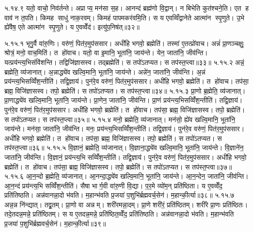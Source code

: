 ५.१४.९
यतो॒ वाचो॒ निव॑र्तन्ते। अप्राप्य॒ मन॑सा स॒ह। आनन्दं ब्रह्म॑णो वि॒द्वान्। न बिभेति कुत॑श्चने॒ति। एत ह वाव॑ न त॒पति। किमह साधु॑ नाक॒रवम्। किमहं पापमकर॑वमि॒ति। स य एवव्विँद्वानेते आत्मा॑न स्पृ॒णुते। उ॒भे ह्ये॑वैष॒ एते आत्मा॑न स्पृ॒णुते। य ए॒वव्वेँद॑। इत्यु॑प॒निष॑त्॥३२॥


\setcounter{anuvakam}{0}

५.१५.१
भृगु॒र्वै वा॑रु॒णिः। वरु॑णं॒ पित॑र॒मुप॑ससार। अधी॑हि भगवो॒ ब्रह्मेति॑। तस्मा॑ ए॒तत्प्रो॑वाच। अन्नं॑ प्रा॒णञ्चक्षुः॒ श्रोत्रं॒ मनो॒ वाच॒मिति॑। त हो॑वाच। यतो॒ वा इ॒मानि॒ भूता॑नि॒ जाय॑न्ते। येन॒ जाता॑नि॒ जीव॑न्ति। यत्प्रय॑न्त्य॒भिसंवि॑शन्ति। तद्विजि॑ज्ञासस्व। तद्ब्रह्मेति॑। स तपो॑ऽतप्यत। स तप॑स्त॒प्त्वा॥३३॥
५.१५.२
अन्नं॒ ब्रह्मेति॒ व्य॑जानात्। अ॒न्नाद्ध्ये॑व खल्वि॒मानि॒ भूता॑नि॒ जाय॑न्ते। अन्ने॑न॒ जाता॑नि॒ जीव॑न्ति। अ॒न्नं प्रय॑न्त्य॒भिसव्विँ॑श॒न्तीति॑। तद्वि॒ज्ञाय॑। पुन॑रे॒व वरु॑णं॒ पित॑र॒मुप॑ससार। अधी॑हि भगवो॒ ब्रह्मेति॑। त हो॑वाच। तप॑सा॒ ब्रह्म॒ विजि॑ज्ञासस्व। तपो॒ ब्रह्मेति॑। स तपो॑ऽतप्यत। स तप॑स्त॒प्त्वा॥३४॥
५.१५.३
प्रा॒णो ब्र॒ह्मेति॒ व्य॑जानात्। प्रा॒णाद्ध्ये॑व खल्वि॒मानि॒ भूता॑नि॒ जाय॑न्ते। प्रा॒णेन॒ जाता॑नि॒ जीव॑न्ति। प्रा॒णं प्रय॑न्त्य॒भिसव्विँ॑श॒न्तीति॑। तद्वि॒ज्ञाय॑। पुन॑रे॒व वरु॑णं॒ पित॑र॒मुप॑ससार। अधी॑हि भगवो॒ ब्रह्मेति॑। त हो॑वाच। तप॑सा॒ ब्रह्म॒ विजि॑ज्ञासस्व। तपो॒ ब्रह्मेति॑। स तपो॑ऽतप्यत। स तप॑स्त॒प्त्वा॥३५॥
५.१५.४
मनो॒ ब्रह्मेति॒ व्य॑जानात्। मन॑सो॒ ह्ये॑व खल्वि॒मानि॒ भूता॑नि॒ जाय॑न्ते। मन॑सा॒ जाता॑नि॒ जीव॑न्ति। मनः॒ प्रय॑न्त्य॒भिसव्विँ॑श॒न्तीति॑। तद्वि॒ज्ञाय॑। पुन॑रे॒व वरु॑णं॒ पित॑र॒मुप॑ससार। अधी॑हि भगवो॒ ब्रह्मेति॑। त हो॑वाच। तप॑सा॒ ब्रह्म॒ विजि॑ज्ञासस्व। तपो॒ ब्रह्मेति॑। स तपो॑ऽतप्यत। स तप॑स्त॒प्त्वा॥३६॥
५.१५.५
वि॒ज्ञानं॒ ब्रह्मेति॒ व्य॑जानात्। वि॒ज्ञाना॒द्ध्ये॑व खल्वि॒मानि॒ भूता॑नि॒ जाय॑न्ते। वि॒ज्ञाने॑न॒ जाता॑नि॒ जीव॑न्ति। वि॒ज्ञानं॒ प्रय॑न्त्य॒भि सव्विँ॑श॒न्तीति॑। तद्वि॒ज्ञाय॑। पुन॑रे॒व वरु॑णं॒ पित॑र॒मुप॑ससार। अधी॑हि भगवो॒ ब्रह्मेति॑। त हो॑वाच। तप॑सा॒ ब्रह्म॒ विजि॑ज्ञासस्व। तपो॒ ब्रह्मेति॑। स तपो॑ऽतप्यत। स तप॑स्त॒प्त्वा॥३७॥
५.१५.६
आ॒न॒न्दो ब्र॒ह्मेति॒ व्य॑जानात्। आ॒नन्दा॒द्ध्ये॑व खल्वि॒मानि॒ भूता॑नि॒ जाय॑न्ते। आ॒न॒न्देन॒ जाता॑नि॒ जीव॑न्ति। आ॒न॒न्दं प्रय॑न्त्य॒भि सव्विँ॑श॒न्तीति॑। सैषा भार्ग॒वी वा॑रु॒णी वि॒द्या। प॒र॒मे व्यो॑म॒न् प्रति॑ष्ठिता। य ए॒वव्वेँद॒ प्रति॑तिष्ठति। अन्न॑वानन्ना॒दो भ॑वति। म॒हान्भ॑वति प्र॒जया॑ प॒शुभि॑र्ब्रह्मवर्च॒सेन॑। म॒हान्की॒र्त्या॥३८॥
५.१५.७
अन्न॒न्न नि॑न्द्यात्। तद्व्र॒तम्। प्रा॒णो वा अन्नम्। शरी॑रमन्ना॒दम्। प्रा॒णे शरी॑रं॒ प्रति॑ष्ठितम्। शरी॑रे प्रा॒णः प्रति॑ष्ठितः। तदे॒तदन्न॒मन्ने॒ प्रति॑ष्ठितम्। स य ए॒तदन्न॒मन्ने॒ प्रति॑ष्ठित॒व्वेँद॒ प्रति॑तिष्ठति। अन्न॑वानन्ना॒दो भ॑वति। म॒हान्भ॑वति प्र॒जया॑ प॒शुभि॑र्ब्रह्मवर्च॒सेन॑। म॒हान्की॒र्त्या॥३९॥
